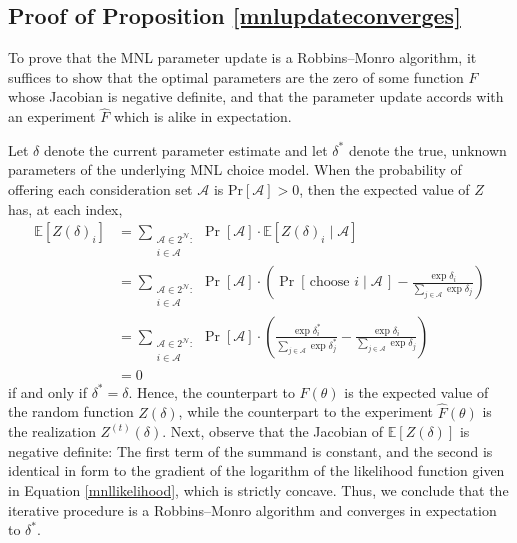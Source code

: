 \documentclass[preprint,12pt,authoryear]{elsarticle}
\begin{document}
\subsection{Proof of Proposition \ref{mnlupdateconverges}}
To prove that the MNL parameter update is a Robbins--Monro algorithm, it suffices to show that the optimal parameters are the zero of some function $F$ whose Jacobian is negative definite, and that the parameter update accords with an experiment $\hat F$ which is alike in expectation.  

Let $\delta$ denote the current parameter estimate and let $\delta^*$ denote the true, unknown parameters of the underlying MNL choice model. When the probability of offering each consideration set $\mathcal{A}$ is $\operatorname{Pr[\mathcal{A}]} > 0$, then the expected value of $Z$ has, at each index,
\begin{align}
\mathbb{E}\left[Z(\delta)_i \right] &= \sum_{\substack{\mathcal{A} \in 2^{\mathcal{N}}: \\ i \in \mathcal{A}}}\operatorname{Pr}\left[\mathcal{A}\right] \cdot \mathbb{E}\left[Z(\delta)_i\;|\;\mathcal{A}\right] \\
&=   \sum_{\substack{\mathcal{A} \in 2^{\mathcal{N}}: \\ i \in \mathcal{A}}}\operatorname{Pr}\left[\mathcal{A}\right] \cdot \left(\operatorname{Pr}\left[\,\text{choose } i\;|\;\mathcal{A}\,\right] - \frac{\exp \delta_i}{\sum_{j\in \mathcal{A}} \exp \delta_j} \right) \\
&= \sum_{\substack{\mathcal{A} \in 2^{\mathcal{N}}: \\ i \in \mathcal{A}}}\operatorname{Pr}\left[\mathcal{A}\right] \cdot \left(\frac{\exp  \delta_i^*}{\sum_{j\in \mathcal{A}} \exp \delta_j^*} - \frac{\exp \delta_i}{\sum_{j\in \mathcal{A}} \exp \delta_j} \right) \\
&= 0
\end{align}
if and only if $\delta^* = \delta$. Hence, the counterpart to $F(\theta)$ is the expected value of the random function $Z(\delta)$, while the counterpart to the experiment $\hat F(\theta)$ is the realization $Z^{(t)}(\delta)$. Next, observe that the Jacobian of $\mathbb{E}\left[Z(\delta) \right]$ is negative definite: The first term of the summand is constant, and the second is identical in form to the gradient of the logarithm of the likelihood function given in Equation \eqref{mnllikelihood}, which is strictly concave. Thus, we conclude that the iterative procedure is a Robbins--Monro algorithm and converges in expectation to $\delta^*$. 
\end{document}
